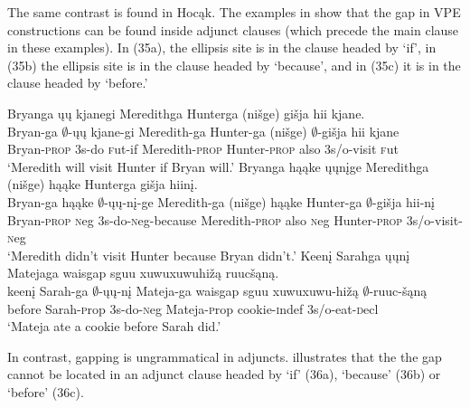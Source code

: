 \documentclass[output=paper]{LSP/langsci}
\begin{document}
The same contrast is found in Hocąk. The examples in  show that the gap in VPE constructions can be found inside adjunct clauses (which precede the main clause in these examples). In (35a), the ellipsis site is in the clause headed by `if', in (35b) the ellipsis site is in the clause headed by `because', and in (35c) it is in the clause headed by `before.'

\begin{exe}
\ex
\begin{xlist}
\ex
\glll Bryanga ųų kjanegi Meredithga Hunterga (nišge) {gišja hii} kjane.\\
Bryan-ga $\emptyset$-ųų kjane-gi Meredith-ga Hunter-ga (nišge) $\emptyset$-{gišja hii} kjane\\
Bryan-\textsc{prop} {\textsc 3s}-do {\textsc fut}-if Meredith-\textsc{prop} Hunter-\textsc{prop} also {\textsc 3s/o}-visit {\textsc fut}\\
\trans `Meredith will visit Hunter if Bryan will.'
\ex
\glll Bryanga hąąke ųųnįge Meredithga (nišge) hąąke Hunterga {gišja hiinį}.\\
Bryan-ga hąąke $\emptyset$-ųų-nį-ge Meredith-ga (nišge) hąąke Hunter-ga $\emptyset$-{gišja hii-nį}\\
Bryan-\textsc{prop} {\textsc neg} {\textsc 3s}-do-{\textsc neg}-because Meredith-\textsc{prop} also {\textsc neg} Hunter-\textsc{prop} {\textsc 3s/o}-visit-{\textsc neg}\\
\trans `Meredith didn't visit Hunter because Bryan didn't.'
\ex
\glll Keenį Sarahga ųųnį Matejaga {waisgap sguu xuwuxuwuhižą} ruucšąną.\\
keenį Sarah-ga $\emptyset$-ųų-nį Mateja-ga {waisgap sguu xuwuxuwu-hižą} $\emptyset$-ruuc-šąną\\
before Sarah-{\textsc prop} {\textsc 3s}-do-{\textsc neg} Mateja-{\textsc prop} cookie-{\textsc indef} {\textsc 3s/o}-eat-{\textsc decl}\\
\trans `Mateja ate a cookie before Sarah did.'
\end{xlist}
\end{exe}

In contrast, gapping is ungrammatical in adjuncts.  illustrates that the the gap cannot be located in an adjunct clause headed by `if' (36a), `because' (36b) or `before' (36c).
\end{document}
